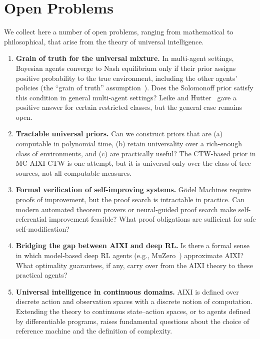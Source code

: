 \documentclass[11pt,a4paper]{article}
\theoremstyle{definition}
\theoremstyle{remark}
\begin{document}
\section{Open Problems}\label{sec:open}

We collect here a number of open problems, ranging from mathematical to
philosophical, that arise from the theory of universal intelligence.

\begin{enumerate}[label=\textbf{OP\arabic*.},leftmargin=*]

\item \textbf{Grain of truth for the universal mixture.}
  In multi-agent settings, Bayesian agents converge to Nash equilibrium only
  if their prior assigns positive probability to the true environment,
  including the other agents' policies (the ``grain of truth''
  assumption~\cite{Leike2016}).  Does the Solomonoff prior satisfy this
  condition in general multi-agent settings?  Leike and
  Hutter~\cite{Leike2016} gave a positive answer for certain restricted
  classes, but the general case remains open.

\item \textbf{Tractable universal priors.}
  Can we construct priors that are (a) computable in polynomial time,
  (b) retain universality over a rich-enough class of environments, and
  (c) are practically useful?  The CTW-based prior in MC-AIXI-CTW is one
  attempt, but it is universal only over the class of tree sources, not
  all computable measures.

\item \textbf{Formal verification of self-improving systems.}
  G\"odel Machines require proofs of improvement, but the proof search is
  intractable in practice.  Can modern automated theorem provers or
  neural-guided proof search make self-referential improvement feasible?
  What proof obligations are sufficient for safe self-modification?

\item \textbf{Bridging the gap between AIXI and deep RL.}
  Is there a formal sense in which model-based deep RL agents (e.g.,
  MuZero~\cite{Schrittwieser2020}) approximate AIXI?  What optimality
  guarantees, if any, carry over from the AIXI theory to these practical
  agents?

\item \textbf{Universal intelligence in continuous domains.}
  AIXI is defined over discrete action and observation spaces with a
  discrete notion of computation.  Extending the theory to continuous
  state--action spaces, or to agents defined by differentiable programs,
  raises fundamental questions about the choice of reference machine and
  the definition of complexity.


\end{enumerate}
\end{document}
